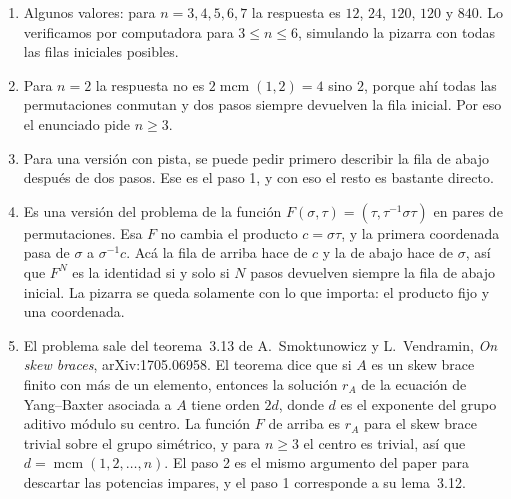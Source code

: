 \documentclass[11pt]{amsproc}
\newcommand{\mcm}{\operatorname{mcm}}
\begin{document}
\begin{enumerate}
  \item Algunos valores: para $n=3,4,5,6,7$ la respuesta es $12$, $24$,
        $120$, $120$ y $840$. Lo verificamos por computadora para
        $3\le n\le 6$, simulando la pizarra con todas las filas iniciales
        posibles.

  \item Para $n=2$ la respuesta no es $2\mcm(1,2)=4$ sino $2$, porque ahí
        todas las permutaciones conmutan y dos pasos siempre devuelven la
        fila inicial. Por eso el enunciado pide $n\ge 3$.

  \item Para una versión con pista, se puede pedir primero describir la fila
        de abajo después de dos pasos. Ese es el paso 1, y con eso el resto
        es bastante directo.

  \item Es una versión del problema de la función
        $F(\sigma,\tau)=(\tau,\tau^{-1}\sigma\tau)$ en pares de
        permutaciones. Esa $F$ no cambia el producto $c=\sigma\tau$, y la
        primera coordenada pasa de $\sigma$ a $\sigma^{-1}c$. Acá la fila de
        arriba hace de $c$ y la de abajo hace de $\sigma$, así que $F^N$ es
        la identidad si y solo si $N$ pasos devuelven siempre la fila de
        abajo inicial. La pizarra se queda solamente con lo que importa: el
        producto fijo y una coordenada.

  \item El problema sale del teorema~3.13 de A.~Smoktunowicz y
        L.~Vendramin, \emph{On skew braces}, arXiv:1705.06958. El teorema
        dice que si $A$ es un skew brace finito con más de un elemento,
        entonces la solución $r_A$ de la ecuación de Yang--Baxter asociada a
        $A$ tiene orden $2d$, donde $d$ es el exponente del grupo aditivo
        módulo su centro. La función $F$ de arriba es $r_A$ para el skew
        brace trivial sobre el grupo simétrico, y para $n\ge 3$ el centro es
        trivial, así que $d=\mcm(1,2,\dots,n)$. El paso 2 es el mismo
        argumento del paper para descartar las potencias impares, y el
        paso 1 corresponde a su lema~3.12.
\end{enumerate}
\end{document}
